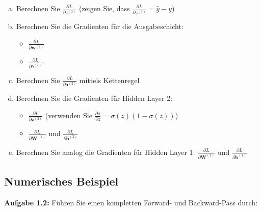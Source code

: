 ﻿\documentclass[12pt,a4paper]{article}
\begin{document}
\begin{enumerate}[(a)]
    \item Berechnen Sie $\frac{\partial L}{\partial z^{(3)}}$ (zeigen Sie, dass $\frac{\partial L}{\partial z^{(3)}} = \hat{y} - y$) 
    
    \item Berechnen Sie die Gradienten für die Ausgabeschicht:
    \begin{itemize}
        \item $\frac{\partial L}{\partial \mathbf{w}^{(3)}}$ 
        \item $\frac{\partial L}{\partial b^{(3)}}$ 
    \end{itemize}
    
    \item Berechnen Sie $\frac{\partial L}{\partial \mathbf{a}^{(2)}}$ mittels Kettenregel 
    
    \item Berechnen Sie die Gradienten für Hidden Layer 2:
    \begin{itemize}
        \item $\frac{\partial L}{\partial \mathbf{z}^{(2)}}$ (verwenden Sie $\frac{\partial \sigma}{\partial z} = \sigma(z)(1-\sigma(z))$) 
        \item $\frac{\partial L}{\partial \mathbf{W}^{(2)}}$ und $\frac{\partial L}{\partial \mathbf{b}^{(2)}}$ 
    \end{itemize}
    
    \item Berechnen Sie analog die Gradienten für Hidden Layer 1: $\frac{\partial L}{\partial \mathbf{W}^{(1)}}$ und $\frac{\partial L}{\partial \mathbf{b}^{(1)}}$ 
\end{enumerate}

\subsection{Numerisches Beispiel }

\textbf{Aufgabe 1.2:} Führen Sie einen kompletten Forward- und Backward-Pass durch:
\end{document}
